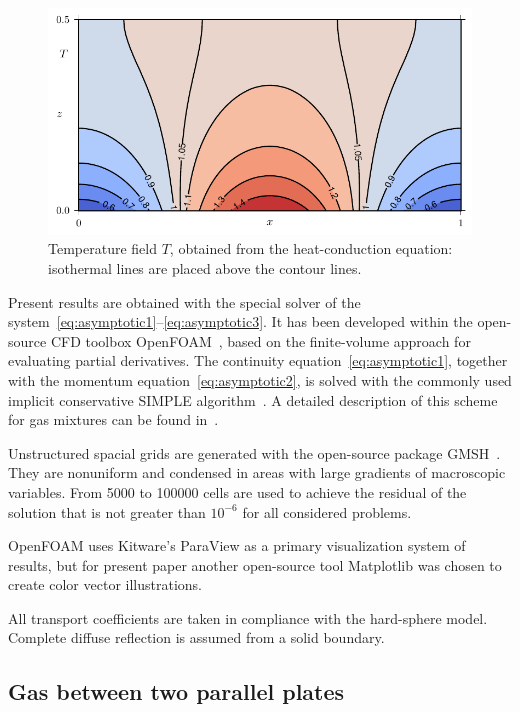 \documentclass[smallextended, referee]{svjour3} %
\begin{document}
\begin{figure}[ht]
	\centering
	\includegraphics{Fig4}
	\caption{Temperature field \(T\), obtained from the heat-conduction equation:
		isothermal lines are placed above the contour lines.}
	\label{fig:moving:T_heat}
\end{figure}

Present results are obtained with the special solver of the system~\eqref{eq:asymptotic1}--\eqref{eq:asymptotic3}.
It has been developed within the open-source CFD toolbox OpenFOAM\textregistered{}~\cite{OpenFOAM1998},
based on the finite-volume approach for evaluating partial derivatives.
The continuity equation~\eqref{eq:asymptotic1}, together with the momentum equation~\eqref{eq:asymptotic2},
is solved with the commonly used implicit conservative SIMPLE algorithm~\cite{SIMPLE}.
A detailed description of this scheme for gas mixtures can be found in~\cite{Laneryd2007}.

Unstructured spacial grids are generated with the open-source package GMSH~\cite{GMSH}.
They are nonuniform and condensed in areas with large gradients of macroscopic variables.
From 5000 to 100000 cells are used to achieve the residual of the solution
that is not greater than \(10^{-6}\) for all considered problems.

OpenFOAM\textregistered{} uses Kitware's ParaView\textregistered{} as a primary visualization system of results,
but for present paper another open-source tool Matplotlib was chosen to create color vector illustrations.

All transport coefficients are taken in compliance with the hard-sphere model.
Complete diffuse reflection is assumed from a solid boundary.

\subsection{Gas between two parallel plates}
\end{document}
